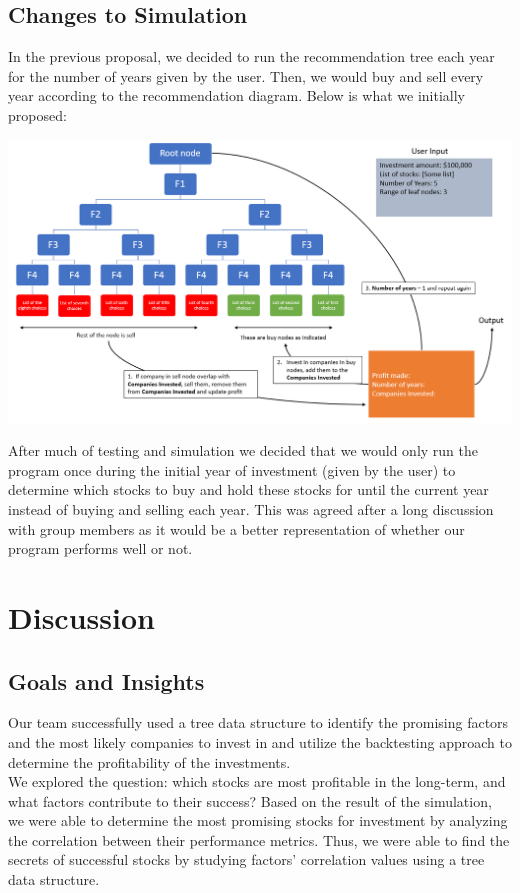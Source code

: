 \documentclass[fontsize=11pt]{article}
\begin{document}
\subsection{Changes to Simulation}
In the previous proposal, we decided to run the recommendation tree each year for the number of years given by the user. Then, we would buy and sell every year according to the recommendation diagram. Below is what we initially proposed:
\begin{center}
\includegraphics[scale=0.65]{ai_diagram.png}
\end{center}
After much of testing and simulation we decided that we would only run the program once during the initial year of investment (given by the user) to determine which stocks to buy and hold these stocks for until the current year instead of buying and selling each year. This was agreed after a long discussion with group members as it would be a better representation of whether our program performs well or not.
\section{Discussion}

\subsection{Goals and Insights}
Our team successfully used a tree data structure to identify the promising factors and the most likely companies to invest in and utilize the backtesting approach to determine the profitability of the investments.\\

We explored the question: which stocks are most profitable in the long-term, and what factors contribute to their success? Based on the result of the simulation, we were able to determine the most promising stocks for investment by analyzing the correlation between their performance metrics. Thus, we were able to find the secrets of successful stocks by studying factors' correlation values using a tree data structure.\\ 
\end{document}
